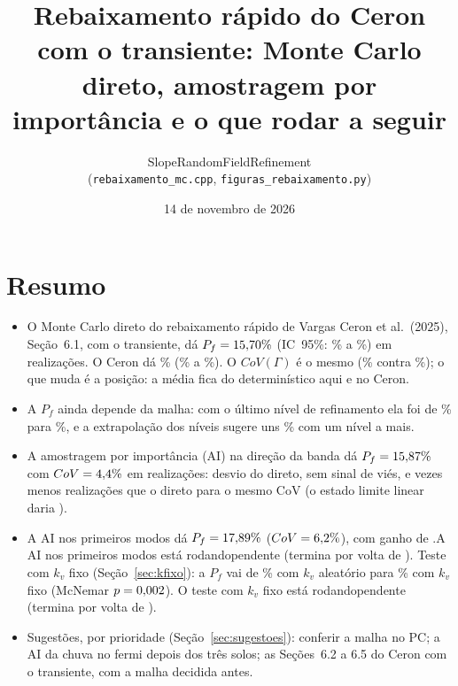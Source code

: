 \documentclass[11pt,a4paper]{article}
\author{SlopeRandomFieldRefinement\\ \small(\texttt{rebaixamento\_mc.cpp}, \texttt{figuras\_rebaixamento.py})}
\title{Rebaixamento rápido do Ceron com o transiente: Monte Carlo direto, amostragem por importância e o que rodar a
seguir}
\date{14 de novembro de 2026}
\begin{document}
\maketitle

\section*{Resumo}
\begin{itemize}
\item O Monte Carlo direto do rebaixamento rápido de Vargas Ceron et al.\ (2025), Seção~6.1, com o transiente, dá
$P_f = 15{,}70\%$ (IC~95\%: \PfDiretoLo\% a \PfDiretoHi\%) em \NDireto{} realizações. O Ceron dá \PfCeron\%
(\PfCeronLo\% a \PfCeronHi\%). O $CoV(\Gamma)$ é o mesmo (\GammaCoV\% contra \CovCeron\%); o que muda é a posição: a
média fica \PosicaoDireto{} do determinístico aqui e \PosicaoCeron{} no Ceron.
\item A $P_f$ ainda depende da malha: com o último nível de refinamento ela foi de \PfNivelDois\% para \PfNivelTres\%,
e a extrapolação dos níveis sugere uns \PfExtrapQuatro\% com um nível a mais.
\item A amostragem por importância (AI) na direção da banda dá $P_f = 15{,}87\%$ com $CoV = 4{,}4\%$ em
\NBanda{} realizações: \DifBanda{} desvio do direto, sem sinal de viés, e \GanhoBanda{} vezes menos realizações que o
direto para o mesmo CoV (o estado limite linear daria \GanhoLinear).
\item \ifmodospronto A AI nos primeiros modos dá $P_f = 17{,}89\%$ ($CoV = 6{,}2\%$), com ganho de
\GanhoModos.\else A AI nos primeiros modos está \ifmodosiniciado rodando\else pendente\fi{} (termina por volta de
\FimModos).\fi{} \ifkfixopronto Teste com $k_v$ fixo (Seção~\ref{sec:kfixo}): a $P_f$ vai de \KPfAleat\% com
$k_v$ aleatório para \KPfFixo\% com $k_v$ fixo (McNemar $p = 0{,}002$). \KConclusao\else O teste com $k_v$ fixo está
\ifkfixoiniciado rodando\else pendente\fi{} (termina por volta de \FimKfixo).\fi
\item Sugestões, por prioridade (Seção~\ref{sec:sugestoes}): conferir a malha no PC; a AI da chuva no fermi depois dos
três solos; as Seções~6.2 a 6.5 do Ceron com o transiente, com a malha decidida antes.
\end{itemize}
\end{document}
